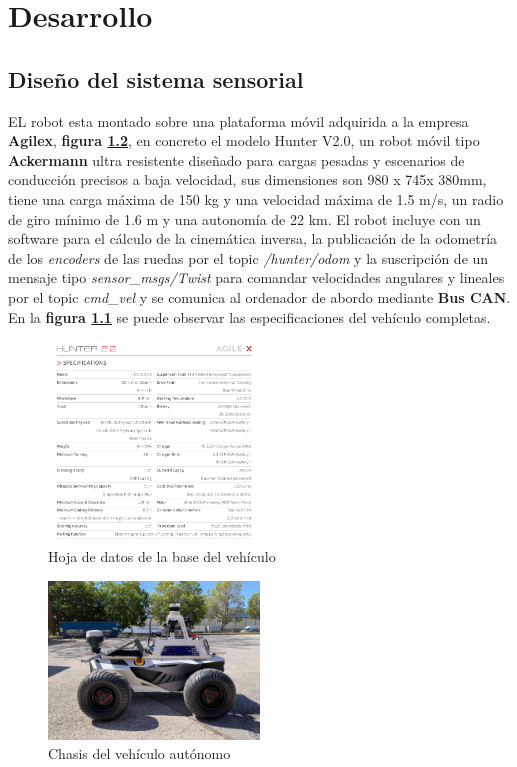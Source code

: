 \chapter{Desarrollo}

\section{Diseño del sistema sensorial}

EL robot esta montado sobre una plataforma móvil adquirida a la empresa \textbf{Agilex}, \textbf{figura \ref{fig:hunter}}, en concreto el 
modelo Hunter V2.0, un robot móvil tipo \textbf{Ackermann} ultra resistente diseñado para cargas pesadas y escenarios de conducción precisos 
a baja velocidad, sus dimensiones son 980 x 745x 380mm, tiene una carga máxima de 150 kg y una velocidad máxima de 1.5 m/s, un radio 
de giro mínimo de 1.6 m y una autonomía de 22 km. El robot incluye con un software para el cálculo de la cinemática inversa, la publicación de 
la odometría de los \textit{encoders} de las ruedas por el topic \textit{/hunter/odom} y la suscripción de un mensaje tipo \textit{sensor\_msgs/Twist} 
para comandar velocidades angulares y lineales por el topic \textit{cmd\_vel} y se comunica al ordenador de abordo mediante \textbf{Bus CAN}. 
En la \textbf{figura \ref{fig:datasheet_hunter}} se puede observar las especificaciones del vehículo completas.


\begin{figure}[h]
    \centering
    \includegraphics[width=0.5\textwidth]{images/hunter_datasheet.png}
    \caption{Hoja de datos de la base del vehículo}
    \label{fig:datasheet_hunter}
\end{figure}

\begin{figure}[h]
    \centering
    \includegraphics[width=0.5\textwidth]{images/hunter_v2.jpeg}
    \caption{Chasis del vehículo autónomo}
    \label{fig:hunter}
\end{figure}

